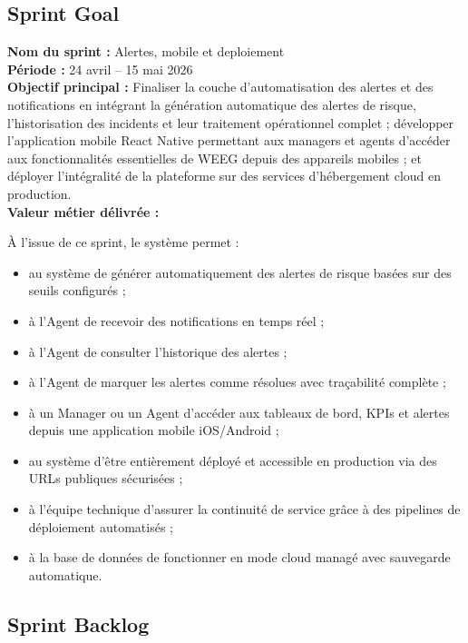 \documentclass[a4paper,12pt]{report}
\begin{document}
\subsection{Sprint Goal}

\textbf{Nom du sprint :} Alertes, mobile et deploiement \\
\textbf{Période :} 24 avril -- 15 mai 2026 \\[4pt]
\textbf{Objectif principal :}
Finaliser la couche d'automatisation des alertes et des notifications
en intégrant la génération automatique des alertes de risque,
l'historisation des incidents et leur traitement opérationnel complet ;
développer l'application mobile React Native permettant aux managers et agents d'accéder
aux fonctionnalités essentielles de WEEG depuis des appareils mobiles ;
et déployer l'intégralité de la plateforme sur des services d'hébergement
cloud en production.
\\[4pt]
\textbf{Valeur métier délivrée :}

À l'issue de ce sprint, le système permet :
\begin{itemize}
    \item au système de générer automatiquement des alertes de risque
          basées sur des seuils configurés ;
    \item à l'Agent de recevoir des notifications en temps réel ;
    \item à l'Agent de consulter l'historique des alertes ;
    \item à l'Agent de marquer les alertes comme résolues avec traçabilité
          complète ;
    \item à un Manager ou un Agent d'accéder aux tableaux de bord, KPIs et
          alertes depuis une application mobile iOS/Android ;
    \item au système d'être entièrement déployé et accessible en production
          via des URLs publiques sécurisées ;
    \item à l'équipe technique d'assurer la continuité de service grâce à
          des pipelines de déploiement automatisés ;
    \item à la base de données de fonctionner en mode cloud managé avec
          sauvegarde automatique.
\end{itemize}

\subsection{Sprint Backlog}
\end{document}
